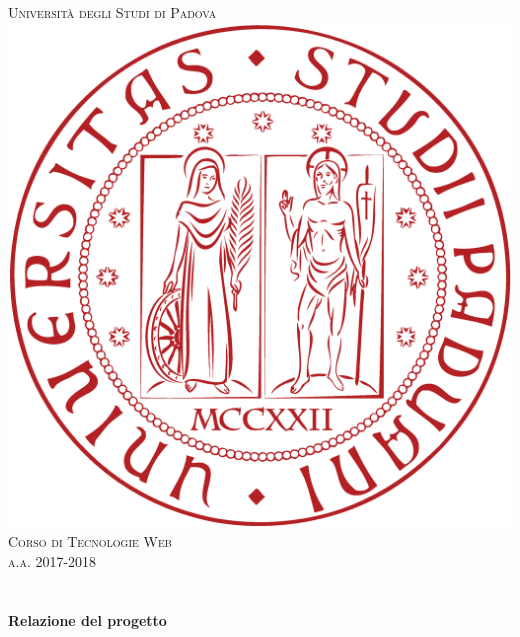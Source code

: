 {\begin{titlepage}
\textsc{\LARGE Università degli Studi di Padova}\\[1.5cm] %
\includegraphics[scale=.13]{logo.eps}\\[1cm] %
\textsc{\Large Corso di Tecnologie Web}\\[0.5cm] %
\textsc{\large a.a. 2017-2018}\\[0.5cm] %


\HRule \\[0.4cm]
{ \huge \bfseries \@title}\\[0.4cm] %
{ \Large \bfseries Relazione del progetto}\\[0.4cm] %
\HRule \\[1.5cm]
 


\end{titlepage}}
